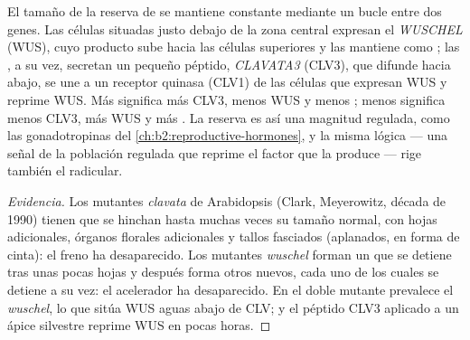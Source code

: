 \begin{proposition}\label{prop:b2:plant-meristems:wus}
El tamaño de la reserva de  se mantiene constante mediante
un bucle entre dos genes. Las células situadas justo debajo de la zona
central expresan el  \emph{WUSCHEL} (WUS), cuyo
producto sube hacia las células superiores y las mantiene como ; las , a su vez, secretan un pequeño péptido,
\emph{CLAVATA3} (CLV3), que difunde hacia abajo, se une a un receptor
quinasa (CLV1) de las células que expresan WUS y reprime WUS. Más  significa más CLV3, menos WUS y menos ; menos  significa menos CLV3, más WUS y más . La reserva es así
una magnitud regulada, como las gonadotropinas del
\cref{ch:b2:reproductive-hormones}, y la misma lógica --- una señal de la
población regulada que reprime el factor que la produce --- rige también
el  radicular.
\end{proposition}
\begin{proof}[Evidencia]
Los mutantes \emph{clavata} de Arabidopsis (Clark, Meyerowitz, década de
1990) tienen  que se hinchan hasta muchas veces su tamaño
normal, con hojas adicionales, órganos florales adicionales y tallos
fasciados (aplanados, en forma de cinta): el freno ha desaparecido. Los
mutantes \emph{wuschel} forman un  que se detiene tras unas pocas
hojas y después forma otros nuevos, cada uno de los cuales se detiene a su
vez: el acelerador ha desaparecido. En el doble mutante prevalece el
 \emph{wuschel}, lo que sitúa WUS aguas abajo de CLV; y el péptido
CLV3 aplicado a un ápice silvestre reprime WUS en pocas horas.
\end{proof}


